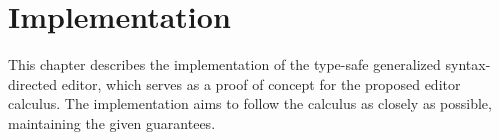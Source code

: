 \chapter{Implementation}
\label{ch:implementation}

This chapter describes the implementation of the type-safe generalized syntax-directed editor, which serves as a proof of concept for the proposed editor calculus. The implementation aims to follow the calculus as closely as possible, maintaining the given guarantees.

